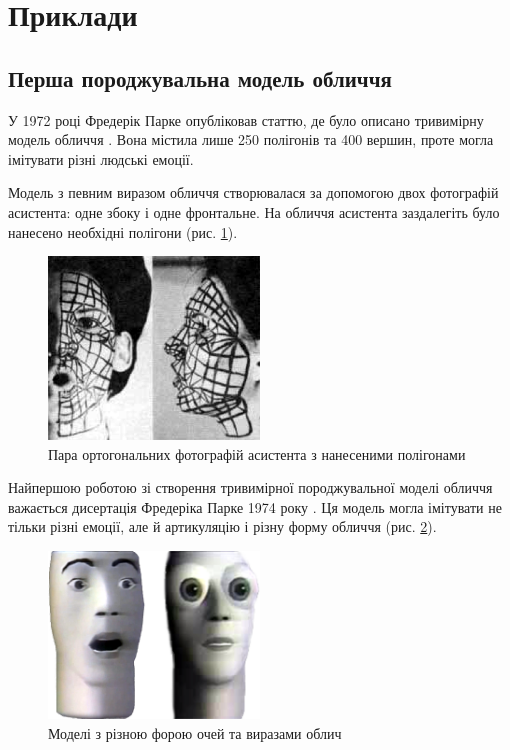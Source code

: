 \section{Приклади}

\subsection{Перша породжувальна модель обличчя}

У 1972 році Фредерік Парке опубліковав статтю,
де було описано тривимірну модель обличчя \cite{Parke:1972}.
Вона містила лише 250 полігонів та 400 вершин,
проте могла імітувати різні людські емоції.

Модель з певним виразом обличчя створювалася за допомогою
двох фотографій асистента: одне збоку і одне фронтальне.
На обличчя асистента заздалегіть було нанесено необхідні полігони
(рис. \ref{fig:parke:face-paint}).
\begin{figure}[h]
  \centering
    \includegraphics[width=0.5\textwidth]{images/Parke-face-paint}
  \caption{Пара ортогональних фотографій асистента з нанесеними полігонами}
  \label{fig:parke:face-paint}
\end{figure}

Найпершою роботою зі створення
тривимірної породжувальної моделі обличчя важається
дисертація Фредеріка Парке 1974 року \cite{Parke:1974}.
Ця модель могла імітувати не тільки різні емоції,
але й артикуляцію і різну форму обличчя
(рис. \ref{fig:parke:face-models}).
\begin{figure}[h]
  \centering
    \includegraphics[width=0.5\textwidth]{images/Parke-faces}
  \caption{Моделі з різною форою очей та виразами облич}
  \label{fig:parke:face-models}
\end{figure}

